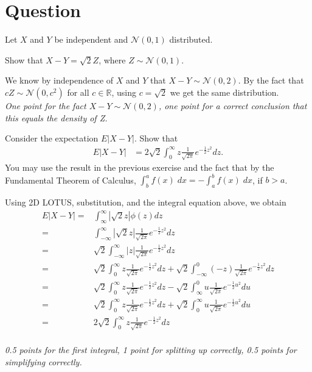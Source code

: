 \section*{Question}

Let $X$ and $Y$ be independent and $\mathcal{N}(0,1)$ distributed.
\begin{exercise}[1]
Show that $X-Y = \sqrt{2}Z$, where $Z \sim \mathcal{N}(0,1)$.
\begin{solution}
    We know by independence of $X$ and $Y$ that $X-Y \sim \mathcal{N}(0,2)$. By the fact that $cZ \sim \mathcal{N}(0,c^2)$ for all $c \in \mathbb{R}$, using $c = \sqrt{2}$ we get the same distribution. \\
    \textit{One point for the fact $X-Y \sim \mathcal{N}(0,2)$, one point for a correct conclusion that this equals the density of Z.}
\end{solution}
\end{exercise}

\begin{exercise}[2]
Consider the expectation $E|X-Y|$. Show that
\begin{align*}
    E|X-Y| &= 2 \sqrt{2} \int_{0}^\infty z \frac{1}{\sqrt{2 \pi}} e^{-\frac{1}{2}z^2} dz.
\end{align*}
You may use the result in the previous exercise and the fact that by the Fundamental Theorem of Calculus, $\int_b^a f(x) \;dx = -\int_a^b f(x) \;dx$, if $b > a$.
\begin{solution}
    Using 2D LOTUS, substitution, and the integral equation above, we obtain
    \begin{align*}
     E|X-Y| =& \int_{\infty}^\infty |\sqrt{2}z| \phi(z) dz \\
     =& \int_{-\infty}^\infty |\sqrt{2}z| \frac{1}{\sqrt{2 \pi}} e^{-\frac{1}{2}z^2} dz \\
     =& \sqrt{2} \int_{-\infty}^\infty |z| \frac{1}{\sqrt{2 \pi}} e^{-\frac{1}{2}z^2} dz \\
     =& \sqrt{2} \int_{0}^\infty z \frac{1}{\sqrt{2 \pi}} e^{-\frac{1}{2}z^2} dz + \sqrt{2} \int_{-\infty}^0 (-z) \frac{1}{\sqrt{2 \pi}} e^{-\frac{1}{2}z^2} dz \\
     =& \sqrt{2} \int_{0}^\infty z \frac{1}{\sqrt{2 \pi}} e^{-\frac{1}{2}z^2} dz - \sqrt{2} \int_{\infty}^0 u \frac{1}{\sqrt{2 \pi}} e^{-\frac{1}{2}u^2} du \\
     =& \sqrt{2} \int_{0}^\infty z \frac{1}{\sqrt{2 \pi}} e^{-\frac{1}{2}z^2} dz + \sqrt{2} \int_{0}^\infty u \frac{1}{\sqrt{2 \pi}} e^{-\frac{1}{2}u^2} du \\
     =& 2 \sqrt{2} \int_{0}^\infty z \frac{1}{\sqrt{2 \pi}} e^{-\frac{1}{2}z^2} dz
    \end{align*} \\
    \textit{0.5 points for the first integral, 1 point for splitting up correctly, 0.5 points for simplifying correctly.}
\end{solution}
\end{exercise}

